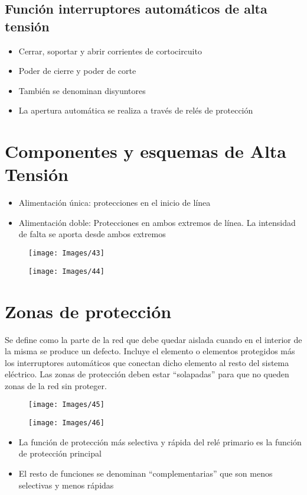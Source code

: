 \subsection{Función interruptores automáticos de alta tensión}
\begin{itemize}
	\item Cerrar, soportar y abrir corrientes de cortocircuito
	\item Poder de cierre y poder de corte
	\item También se denominan disyuntores
	\item La apertura automática se realiza a través de relés de protección
\end{itemize}
\section{Componentes y esquemas de Alta Tensión}
\begin{itemize}
	\item Alimentación única: protecciones en el inicio de línea
	\item Alimentación doble: Protecciones en ambos extremos de línea. La intensidad de falta se aporta desde ambos extremos
\end{itemize}
\begin{figure}[H]
	\centering
	\texttt{[image: Images/43]}
	\label{fig:43}
\end{figure}

\begin{figure}[H]
	\centering
	\texttt{[image: Images/44]}
	\label{fig:44}
\end{figure}


\section{Zonas de protección}
Se define como la parte de la red que debe quedar aislada cuando en el interior de la misma se produce un defecto. Incluye el elemento o elementos protegidos más los interruptores automáticos que conectan dicho elemento al resto del sistema eléctrico. Las zonas de protección deben estar “solapadas” para que no queden zonas de la red sin proteger.
\begin{figure}[H]
	\centering
	\texttt{[image: Images/45]}
	\label{fig:45}
\end{figure}
\begin{figure}[H]
	\centering
	\texttt{[image: Images/46]}
	\label{fig:46}
\end{figure}
\begin{itemize}
	\item La función de protección más selectiva y rápida del relé primario es la función de protección principal
	\item El resto de funciones se denominan “complementarias” que son menos selectivas y menos rápidas
\end{itemize}
